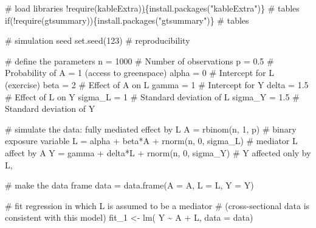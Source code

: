 \documentclass[
  singlecolumn]{article}
\newenvironment{Shaded}{}{}
\newcommand{\AttributeTok}[1]{\textcolor[rgb]{0.84,0.23,0.29}{#1}}
\newcommand{\CommentTok}[1]{\textcolor[rgb]{0.42,0.45,0.49}{#1}}
\newcommand{\ControlFlowTok}[1]{\textcolor[rgb]{0.84,0.23,0.29}{#1}}
\newcommand{\DecValTok}[1]{\textcolor[rgb]{0.00,0.36,0.77}{#1}}
\newcommand{\ErrorTok}[1]{\textcolor[rgb]{1.00,0.33,0.33}{\underline{#1}}}
\newcommand{\FloatTok}[1]{\textcolor[rgb]{0.00,0.36,0.77}{#1}}
\newcommand{\FunctionTok}[1]{\textcolor[rgb]{0.44,0.26,0.76}{#1}}
\newcommand{\NormalTok}[1]{\textcolor[rgb]{0.14,0.16,0.18}{#1}}
\newcommand{\OtherTok}[1]{\textcolor[rgb]{0.44,0.26,0.76}{#1}}
\newcommand{\SpecialCharTok}[1]{\textcolor[rgb]{0.00,0.36,0.77}{#1}}
\newcommand{\StringTok}[1]{\textcolor[rgb]{0.01,0.18,0.38}{#1}}
\begin{document}
\begin{Shaded}
\begin{Highlighting}[]
\CommentTok{\# load libraries}
\SpecialCharTok{!}\FunctionTok{require}\NormalTok{(kableExtra)}\ErrorTok{)}\NormalTok{\{}\FunctionTok{install.packages}\NormalTok{(}\StringTok{"kableExtra"}\NormalTok{)\} }\CommentTok{\# tables}
\ControlFlowTok{if}\NormalTok{(}\SpecialCharTok{!}\FunctionTok{require}\NormalTok{(gtsummary))\{}\FunctionTok{install.packages}\NormalTok{(}\StringTok{"gtsummary"}\NormalTok{)\} }\CommentTok{\# tables}

\CommentTok{\# simulation seed}
\FunctionTok{set.seed}\NormalTok{(}\DecValTok{123}\NormalTok{) }\CommentTok{\#  reproducibility}

\CommentTok{\# define the parameters }
\NormalTok{n }\OtherTok{=} \DecValTok{1000} \CommentTok{\# Number of observations}
\NormalTok{p }\OtherTok{=} \FloatTok{0.5}  \CommentTok{\# Probability of A = 1 (access to greenspace)}
\NormalTok{alpha }\OtherTok{=} \DecValTok{0} \CommentTok{\# Intercept for L (exercise)}
\NormalTok{beta }\OtherTok{=} \DecValTok{2}  \CommentTok{\# Effect of A on L }
\NormalTok{gamma }\OtherTok{=} \DecValTok{1} \CommentTok{\# Intercept for Y }
\NormalTok{delta }\OtherTok{=} \FloatTok{1.5} \CommentTok{\# Effect of L on Y}
\NormalTok{sigma\_L }\OtherTok{=} \DecValTok{1} \CommentTok{\# Standard deviation of L}
\NormalTok{sigma\_Y }\OtherTok{=} \FloatTok{1.5} \CommentTok{\# Standard deviation of Y}

\CommentTok{\# simulate the data: fully mediated effect by L}
\NormalTok{A }\OtherTok{=} \FunctionTok{rbinom}\NormalTok{(n, }\DecValTok{1}\NormalTok{, p) }\CommentTok{\# binary exposure variable}
\NormalTok{L }\OtherTok{=}\NormalTok{ alpha }\SpecialCharTok{+}\NormalTok{ beta}\SpecialCharTok{*}\NormalTok{A }\SpecialCharTok{+} \FunctionTok{rnorm}\NormalTok{(n, }\DecValTok{0}\NormalTok{, sigma\_L) }\CommentTok{\# mediator L affect by A}
\NormalTok{Y }\OtherTok{=}\NormalTok{ gamma }\SpecialCharTok{+}\NormalTok{ delta}\SpecialCharTok{*}\NormalTok{L }\SpecialCharTok{+} \FunctionTok{rnorm}\NormalTok{(n, }\DecValTok{0}\NormalTok{, sigma\_Y) }\CommentTok{\# Y affected only by L,}

\CommentTok{\# make the data frame}
\NormalTok{data }\OtherTok{=} \FunctionTok{data.frame}\NormalTok{(}\AttributeTok{A =}\NormalTok{ A, }\AttributeTok{L =}\NormalTok{ L, }\AttributeTok{Y =}\NormalTok{ Y)}

\CommentTok{\# fit regression in which L is assumed to be a mediator}
\CommentTok{\# (cross{-}sectional data is consistent with this model)}
\NormalTok{fit\_1 }\OtherTok{\textless{}{-}} \FunctionTok{lm}\NormalTok{( Y }\SpecialCharTok{\textasciitilde{}}\NormalTok{ A }\SpecialCharTok{+}\NormalTok{ L, }\AttributeTok{data =}\NormalTok{ data)}


\end{Highlighting}
\end{Shaded}
\end{document}
